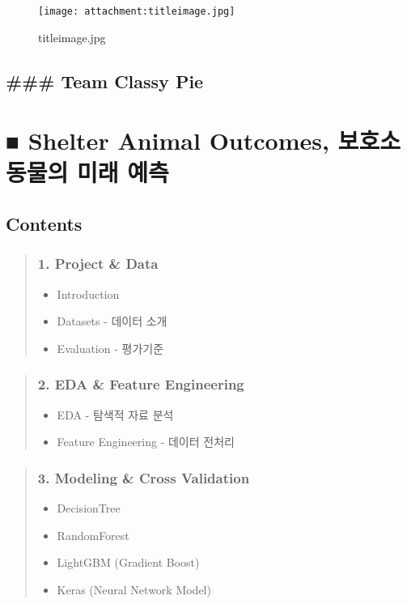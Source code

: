 \documentclass[11pt]{article}
\makeatletter
\def\maxwidth{\ifdim\Gin@nat@width>\linewidth\linewidth
    \else\Gin@nat@width\fi}
\let\Oldincludegraphics\includegraphics
\renewcommand{\includegraphics}[1]{\Oldincludegraphics[width=.8\maxwidth]{#1}}
\providecommand{\tightlist}{%
      \setlength{\itemsep}{0pt}\setlength{\parskip}{0pt}}
\makeatother
\begin{document}
    

    \begin{figure}
\centering
\texttt{[image: attachment:titleimage.jpg]}
\caption{titleimage.jpg}
\end{figure}

    \subsection{\#\#\# Team Classy Pie}\label{team-classy-pie}

\section{■ Shelter Animal Outcomes, 보호소 동물의 미래
예측}\label{shelter-animal-outcomes-uxbcf4uxd638uxc18c-uxb3d9uxbb3cuxc758-uxbbf8uxb798-uxc608uxce21}

    \subsection{Contents}\label{contents}

\begin{quote}
\subsubsection{1. Project \& Data}\label{project-data}

\begin{itemize}
\tightlist
\item
  Introduction
\item
  Datasets - 데이터 소개
\item
  Evaluation - 평가기준
\end{itemize}
\end{quote}

\begin{quote}
\subsubsection{2. EDA \& Feature
Engineering}\label{eda-feature-engineering}

\begin{itemize}
\tightlist
\item
  EDA - 탐색적 자료 분석
\item
  Feature Engineering - 데이터 전처리
\end{itemize}
\end{quote}

\begin{quote}
\subsubsection{3. Modeling \& Cross
Validation}\label{modeling-cross-validation}

\begin{itemize}
\tightlist
\item
  DecisionTree
\item
  RandomForest
\item
  LightGBM (Gradient Boost)
\item
  Keras (Neural Network Model)
\end{itemize}
\end{quote}
\end{document}
